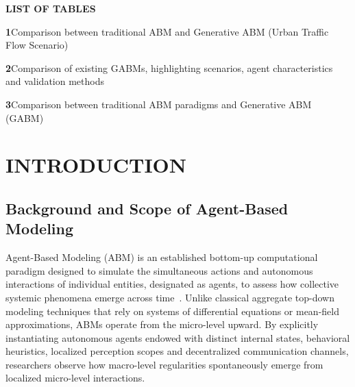 \documentclass[12pt,a4paper]{report}
\begin{document}
\clearpage


\clearpage
\thispagestyle{plain}
\begin{center}
{\fontsize{18}{22}\selectfont\bfseries LIST OF TABLES}\par
\end{center}
\vspace{0.8cm}

\noindent\textbf{1}\quad Comparison between traditional ABM and Generative ABM (Urban Traffic Flow Scenario)\dotfill\pageref{tab:table1_traffic}\par
\vspace{8pt}
\noindent\textbf{2}\quad Comparison of existing GABMs, highlighting scenarios, agent characteristics and validation methods\dotfill\pageref{tab:table2_gabms}\par
\vspace{8pt}
\noindent\textbf{3}\quad Comparison between traditional ABM paradigms and Generative ABM (GABM)\dotfill\pageref{tab:table3_comparison}\par

\clearpage




\chapter{INTRODUCTION}
\label{chap:intro}

\section{Background and Scope of Agent-Based Modeling}
\label{sec:background}

Agent-Based Modeling (ABM) is an established bottom-up computational paradigm designed to simulate the simultaneous actions and autonomous interactions of individual entities, designated as agents, to assess how collective systemic phenomena emerge across time~\cite{bonabeau2002agent,macal2010tutorial}. Unlike classical aggregate top-down modeling techniques that rely on systems of differential equations or mean-field approximations, ABMs operate from the micro-level upward. By explicitly instantiating autonomous agents endowed with distinct internal states, behavioral heuristics, localized perception scopes and decentralized communication channels, researchers observe how macro-level regularities spontaneously emerge from localized micro-level interactions.
\end{document}
